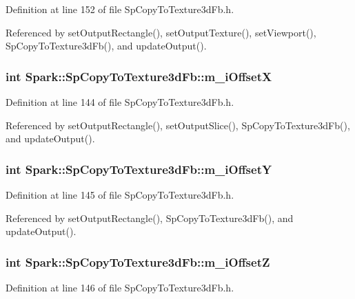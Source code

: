 Definition at line 152 of file Sp\-Copy\-To\-Texture3d\-Fb.h.

Referenced by set\-Output\-Rectangle(), set\-Output\-Texture(), set\-Viewport(), Sp\-Copy\-To\-Texture3d\-Fb(), and update\-Output().
\subsubsection{\setlength{\rightskip}{0pt plus 5cm}int {\bf Spark::Sp\-Copy\-To\-Texture3d\-Fb::m\_\-i\-Offset\-X}\hspace{0.3cm}{\tt  [protected]}}\label{classSpark_1_1SpCopyToTexture3dFb_p1}


Definition at line 144 of file Sp\-Copy\-To\-Texture3d\-Fb.h.

Referenced by set\-Output\-Rectangle(), set\-Output\-Slice(), Sp\-Copy\-To\-Texture3d\-Fb(), and update\-Output().
\subsubsection{\setlength{\rightskip}{0pt plus 5cm}int {\bf Spark::Sp\-Copy\-To\-Texture3d\-Fb::m\_\-i\-Offset\-Y}\hspace{0.3cm}{\tt  [protected]}}\label{classSpark_1_1SpCopyToTexture3dFb_p2}


Definition at line 145 of file Sp\-Copy\-To\-Texture3d\-Fb.h.

Referenced by set\-Output\-Rectangle(), Sp\-Copy\-To\-Texture3d\-Fb(), and update\-Output().
\subsubsection{\setlength{\rightskip}{0pt plus 5cm}int {\bf Spark::Sp\-Copy\-To\-Texture3d\-Fb::m\_\-i\-Offset\-Z}\hspace{0.3cm}{\tt  [protected]}}\label{classSpark_1_1SpCopyToTexture3dFb_p3}


Definition at line 146 of file Sp\-Copy\-To\-Texture3d\-Fb.h.

